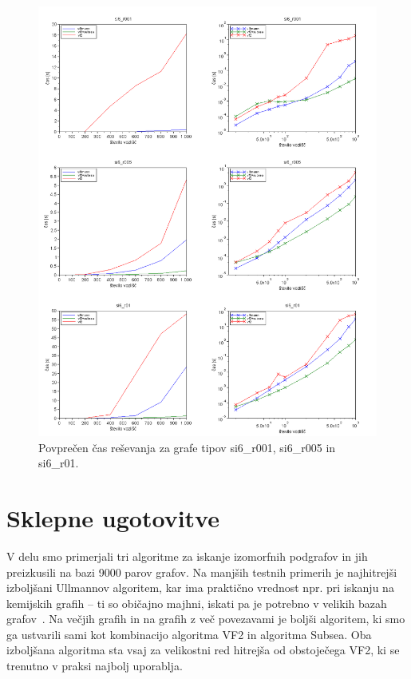 \documentclass[a4paper, 12pt, ]{book}
\begin{document}
\begin{figure}
\begin{center}
\includegraphics[width=15cm]{img/results2_si6.png}
\end{center}
\caption{Povprečen čas reševanja za grafe tipov si6\_r001, si6\_r005 in si6\_r01.}
\label{pic_res2_si6}
\end{figure}




\chapter{Sklepne ugotovitve}

	V delu smo primerjali tri algoritme za iskanje izomorfnih podgrafov in jih preizkusili na bazi 9000 parov grafov. Na manjših testnih primerih je najhitrejši
	izboljšani Ullmannov algoritem, kar ima praktično vrednost npr. pri iskanju na kemijskih grafih -- ti so običajno majhni, iskati pa je potrebno v velikih
	bazah grafov~\cite{chem}. Na večjih grafih in na grafih z več povezavami je boljši algoritem, ki smo ga ustvarili sami kot kombinacijo algoritma VF2
	in algoritma Subsea. Oba izboljšana algoritma sta vsaj za velikostni red hitrejša od obstoječega VF2, ki se trenutno v praksi najbolj uporablja.
	
\end{document}
